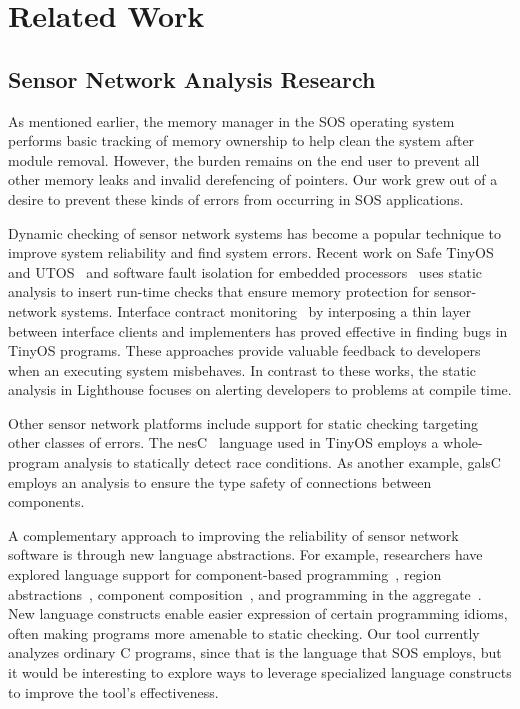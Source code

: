 \section{Related Work}
\label{sec:related}

\subsection{Sensor Network Analysis Research}

As mentioned earlier, the memory manager in the SOS operating
system~\cite{sos} performs basic tracking of memory ownership to help
clean the system after module removal.
%
However, the burden remains on the end user to prevent all other memory
leaks and invalid derefencing of pointers.
%
Our work grew out of a desire to prevent these kinds of errors from
occurring in SOS applications.



Dynamic checking of sensor network systems has become a popular technique to
improve system reliability and find system errors.
%
Recent work on Safe TinyOS and UTOS~\cite{regehr06memory} and software fault
isolation for embedded processors~\cite{kumar07system} uses static analysis
to insert run-time checks that ensure memory protection for sensor-network
systems.
%
Interface contract monitoring~\cite{archer07interface} by interposing a thin
layer between interface clients and implementers has proved effective in
finding bugs in TinyOS programs.
%
These approaches provide valuable feedback to developers when an executing
system misbehaves.
%
In contrast to these works, the static analysis in Lighthouse focuses on
alerting developers to problems at compile time.



Other sensor network platforms include support for static checking targeting
other classes of errors.  
%
The nesC~\cite{nesC} language used in TinyOS employs a whole-program
analysis to statically detect race conditions.  
%
As another example, galsC~\cite{TinyGALS,galsC} employs an analysis to
ensure the type safety of connections between components.  



A complementary approach to improving the reliability of sensor network
software is through new language abstractions.  
%
For example, researchers have explored language support for component-based
programming~\cite{TinyOS,nesC,galsC}, region
abstractions~\cite{conf/mobisys/WhitehouseSCB04,conf/nsdi/WelshM04},
component composition~\cite{conf/sensys/GreensteinKE04}, and programming in
the aggregate~\cite{1052213,conf/dcoss/GummadiGG05}.
%
New language constructs enable easier expression of certain programming
idioms, often making programs more amenable to static checking.  
%
Our tool currently analyzes ordinary C programs, since that is the language
that SOS employs, but it would be interesting to explore ways to leverage
specialized language constructs to improve the tool's effectiveness.



